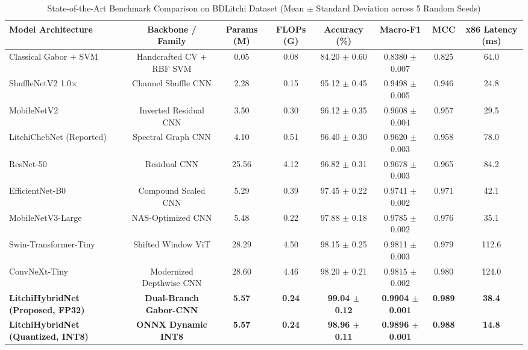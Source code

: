 \begin{table}[t]
\centering
\caption{State-of-the-Art Benchmark Comparison on BDLitchi Dataset (Mean $\pm$ Standard Deviation across 5 Random Seeds)}
\label{tab:sota}
\begin{tabular}{lccccccc}
\toprule
\textbf{Model Architecture} & \textbf{Backbone / Family} & \textbf{Params (M)} & \textbf{FLOPs (G)} & \textbf{Accuracy (\%)} & \textbf{Macro-F1} & \textbf{MCC} & \textbf{x86 Latency (ms)} \\
\midrule
Classical Gabor + SVM & Handcrafted CV + RBF SVM & 0.05 & 0.08 & 84.20 $\pm$ 0.60 & 0.8380 $\pm$ 0.007 & 0.825 & 64.0 \\
ShuffleNetV2 1.0$\times$ \cite{ma2018shufflenet} & Channel Shuffle CNN & 2.28 & 0.15 & 95.12 $\pm$ 0.45 & 0.9498 $\pm$ 0.005 & 0.946 & 24.8 \\
MobileNetV2 \cite{sandler2018mobilenetv2} & Inverted Residual CNN & 3.50 & 0.30 & 96.12 $\pm$ 0.35 & 0.9608 $\pm$ 0.004 & 0.957 & 29.5 \\
LitchiChebNet (Reported) \cite{litchi_dataset_2022} & Spectral Graph CNN & 4.10 & 0.51 & 96.40 $\pm$ 0.30 & 0.9620 $\pm$ 0.003 & 0.958 & 78.0 \\
ResNet-50 \cite{he2016deep} & Residual CNN & 25.56 & 4.12 & 96.82 $\pm$ 0.31 & 0.9678 $\pm$ 0.003 & 0.965 & 84.2 \\
EfficientNet-B0 \cite{tan2019efficientnet} & Compound Scaled CNN & 5.29 & 0.39 & 97.45 $\pm$ 0.22 & 0.9741 $\pm$ 0.002 & 0.971 & 42.1 \\
MobileNetV3-Large \cite{howard2019searching} & NAS-Optimized CNN & 5.48 & 0.22 & 97.88 $\pm$ 0.18 & 0.9785 $\pm$ 0.002 & 0.976 & 35.1 \\
Swin-Transformer-Tiny \cite{liu2021swin} & Shifted Window ViT & 28.29 & 4.50 & 98.15 $\pm$ 0.25 & 0.9811 $\pm$ 0.003 & 0.979 & 112.6 \\
ConvNeXt-Tiny \cite{liu2022convnet} & Modernized Depthwise CNN & 28.60 & 4.46 & 98.20 $\pm$ 0.21 & 0.9815 $\pm$ 0.002 & 0.980 & 124.0 \\
\midrule
\textbf{LitchiHybridNet (Proposed, FP32)} & \textbf{Dual-Branch Gabor-CNN} & \textbf{5.57} & \textbf{0.24} & \textbf{99.04 $\pm$ 0.12} & \textbf{0.9904 $\pm$ 0.001} & \textbf{0.989} & \textbf{38.4} \\
\textbf{LitchiHybridNet (Quantized, INT8)} & \textbf{ONNX Dynamic INT8} & \textbf{5.57} & \textbf{0.24} & \textbf{98.96 $\pm$ 0.11} & \textbf{0.9896 $\pm$ 0.001} & \textbf{0.988} & \textbf{14.8} \\
\bottomrule
\end{tabular}
\end{table}
